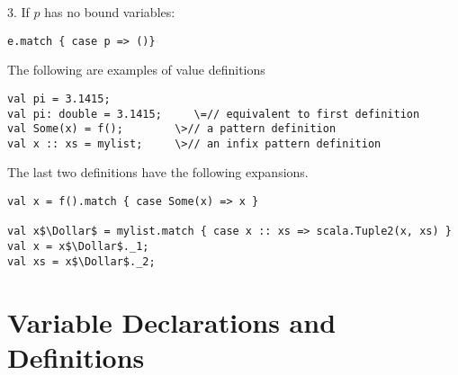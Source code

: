 \documentclass[11pt]{report}
\newcommand{\iflet}[1]{}
\begin{document}
3. If $p$ has no bound variables:
\begin{verbatim}
e.match { case p => ()}
\end{verbatim}

\example
The following are examples of value definitions
\begin{verbatim}
val pi = 3.1415;
val pi: double = 3.1415;     \=// equivalent to first definition
val Some(x) = f();        \>// a pattern definition
val x :: xs = mylist;     \>// an infix pattern definition
\end{verbatim}

The last two definitions have the following expansions.
\begin{verbatim}
val x = f().match { case Some(x) => x }

val x$\Dollar$ = mylist.match { case x :: xs => scala.Tuple2(x, xs) }
val x = x$\Dollar$._1;
val xs = x$\Dollar$._2;

\end{verbatim}

\iflet{
\section{Let Definitions}
\label{sec:letdef}

\syntax\begin{verbatim}
  PureDef      \=::= \= $\LET$ ValDef {`,' ValDef}
  ValDef       \>::= \> Id [`:' Type] `=' Expr
\end{verbatim}

A let definition $\LET;x: T = e$ defines $x$ as a name of the value
that results from the delayed evaluation of $e$. The type $T$ must be
a concrete value type (\sref{sec:types}) and the type of the
expression $e$ must conform to $T$. The effect of the let definition
is to bind the left-hand side $x$ to the result of evaluating $e$
converted to type $T$.  However, the expression $e$ is not evaluated
at the point of the let definition, but is instead evaluated the first
time $x$ is dereferenced during execution of the program (which might
be never at all). An attempt to dereference $x$ again in the course of
evaluation of $e$ leads to a run-time error.  Other threads trying to
dereference $x$ while $e$ is being evaluated block until evaluation is
complete.

The type $T$ may be omitted if it can be determined using local type
inference (\sref{sec:local-type-inf}).
}

\section{Variable Declarations and Definitions}
\label{sec:vardef}
\end{document}
